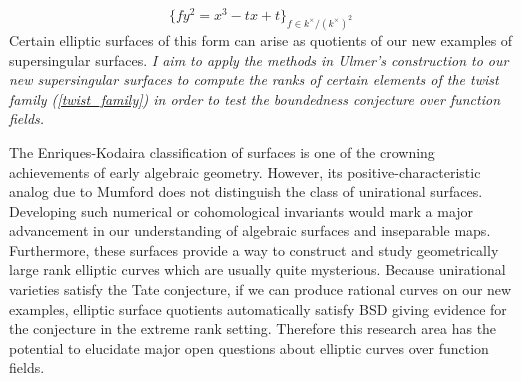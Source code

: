 \documentclass[11pt]{article}
\begin{document}
\begin{equation} \label{twist_family}
\{ f y^2 = x^3 - t x + t \}_{f \in k^\times / (k^\times)^2} 
\end{equation} 
Certain elliptic surfaces of this form can arise as quotients of our new examples of supersingular surfaces. \emph{I aim to apply the methods in Ulmer's construction to our new supersingular surfaces to compute the ranks of certain elements of the twist family (\ref{twist_family}) in order to test the boundedness conjecture over function fields.}
\par
The Enriques-Kodaira classification of surfaces is one of the crowning achievements of early algebraic geometry. However, its positive-characteristic analog due to Mumford  does not distinguish the class of unirational surfaces. Developing such numerical or cohomological invariants would mark a major advancement in our understanding of algebraic surfaces and inseparable maps. Furthermore, these surfaces provide a way to construct and study geometrically large rank elliptic curves which are usually quite mysterious. Because unirational varieties satisfy the Tate conjecture, if we can produce rational curves on our new examples, elliptic surface quotients automatically satisfy BSD giving evidence for the conjecture in the extreme rank setting. Therefore this research area has the potential to elucidate major open questions about elliptic curves over function fields.  
\vspace{-2.5em}
\begingroup
\let\enotesize\normalsize
\renewcommand\notesname{\hrulefill \vspace{-0.9em}}
\theendnotes
\endgroup
\end{document}
